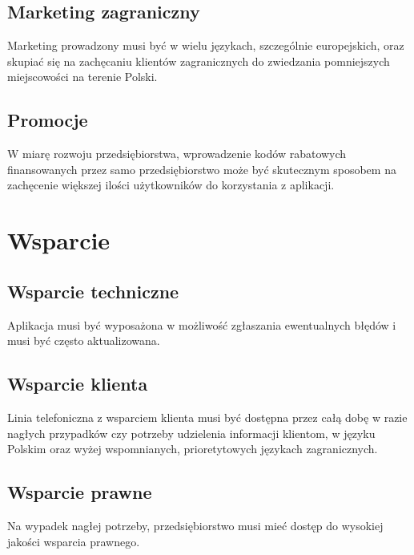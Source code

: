 \subsection{Marketing zagraniczny}
Marketing prowadzony musi być w wielu językach, szczególnie europejskich, oraz skupiać się na zachęcaniu klientów zagranicznych do zwiedzania pomniejszych miejscowości na terenie Polski.

\subsection{Promocje}
W miarę rozwoju przedsiębiorstwa, wprowadzenie kodów rabatowych finansowanych przez samo przedsiębiorstwo może być skutecznym sposobem na zachęcenie większej ilości użytkowników do korzystania z aplikacji.

\section{Wsparcie}
\subsection{Wsparcie techniczne}
Aplikacja musi być wyposażona w możliwość zgłaszania ewentualnych błędów i musi być często aktualizowana.

\subsection{Wsparcie klienta}
Linia telefoniczna z wsparciem klienta musi być dostępna przez całą dobę w razie nagłych przypadków czy potrzeby udzielenia informacji klientom, w języku Polskim oraz wyżej wspomnianych, prioretytowych językach zagranicznych.

\subsection{Wsparcie prawne}
Na wypadek nagłej potrzeby, przedsiębiorstwo musi mieć dostęp do wysokiej jakości wsparcia prawnego.